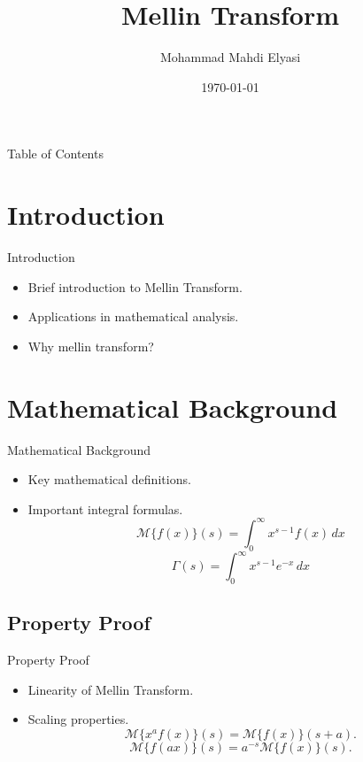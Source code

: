 \documentclass{beamer}
\title[Mellin Transform]{Mellin Transform}
\author[]{Mohammad Mahdi Elyasi}
\institute[Amirkabir University of Techonology]{
    Supervisor: Dr. Moradi \\[1cm] %
    Faculty of Electrical Engineering \\ %
}
\date{\today} %
\begin{document}
\begin{frame}
    
    \titlepage
\end{frame}

\begin{frame}{Table of Contents}
    \tableofcontents
\end{frame}

\section{Introduction}
\begin{frame}{Introduction}
    \begin{itemize}
        \item Brief introduction to Mellin Transform.
        \item Applications in mathematical analysis.
        \item Why mellin transform?
    \end{itemize}
\end{frame}

\section{Mathematical Background}
\begin{frame}{Mathematical Background}
    \begin{itemize}
        \item Key mathematical definitions.
        \item Important integral formulas.
        \begin{equation}
            \mathcal{M}\{f(x)\}(s) = \int_{0}^{\infty} x^{s-1} f(x) \, dx
        \end{equation}
        \begin{equation}
            \Gamma(s) = \int_{0}^{\infty} x^{s-1} e^{-x} \, dx
        \end{equation}
        
    \end{itemize}
\end{frame}


\subsection{Property Proof}
\begin{frame}{Property Proof}
    \begin{itemize}
        \item Linearity of Mellin Transform.
        \item Scaling properties.
        \begin{equation}
            \mathcal{M}\{x^a f(x)\}(s) = \mathcal{M}\{f(x)\}(s + a).
        \end{equation}
        \begin{equation}
            \mathcal{M}\{f(ax)\}(s) = a^{-s} \mathcal{M}\{f(x)\}(s).
        \end{equation}
    \end{itemize}
\end{frame}
\end{document}
